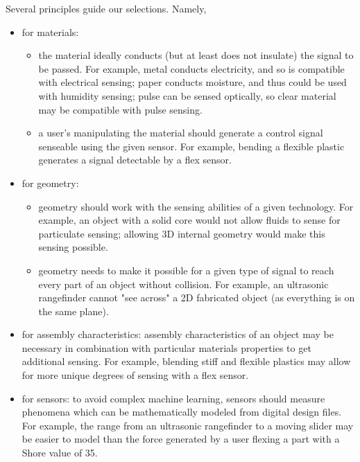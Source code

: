     Several principles guide our selections. Namely,
    \begin{itemize}
      \item for materials: \begin{itemize}
        \item the material ideally conducts (but at least does not insulate) the signal to be passed. For example, metal conducts electricity, and so is compatible with electrical sensing; paper conducts moisture, and thus could be used with humidity sensing; pulse can be sensed optically, so clear material may be compatible with pulse sensing.
        \item a user's manipulating the material should generate a control signal senseable using the given sensor. For example, bending a flexible plastic generates a signal detectable by a flex sensor. %
        \end{itemize}
      
      \item for geometry: \begin{itemize}
        \item geometry should work with the sensing abilities of a given technology. For example, an object with a solid core would not allow fluids to sense for particulate sensing; allowing 3D internal geometry would make this sensing possible.
        \item geometry needs to make it possible for a given type of signal to reach every part of an object without collision. For example, an ultrasonic rangefinder cannot "see across" a 2D fabricated object (as everything is on the same plane). 
        \end{itemize}
      
      \item for assembly characteristics: assembly characteristics of an object may be necessary in combination with particular materials properties to get additional sensing. For example, blending stiff and flexible plastics may allow for more unique degrees of sensing with a flex sensor.
      
      \item for sensors: to avoid complex machine learning, sensors should measure phenomena which can be mathematically modeled from digital design files. For example, the range from an ultrasonic rangefinder to a moving slider may be easier to model than the force generated by a user flexing a part with a Shore value of 35.  
    \end{itemize}
    
